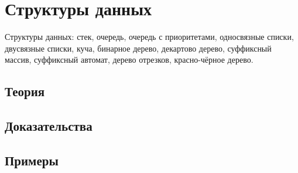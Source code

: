 
\section{Структуры данных}
\label{sec:1.3.08-data-structures}

\begin{ticket}
Структуры данных: стек, очередь, очередь с приоритетами, односвязные списки, двусвязные списки, куча, бинарное дерево, декартово дерево, суффиксный массив, суффиксный автомат, дерево отрезков, красно-чёрное дерево.
\end{ticket}

\subsection*{Теория}

\subsection*{Доказательства}

\subsection*{Примеры}
